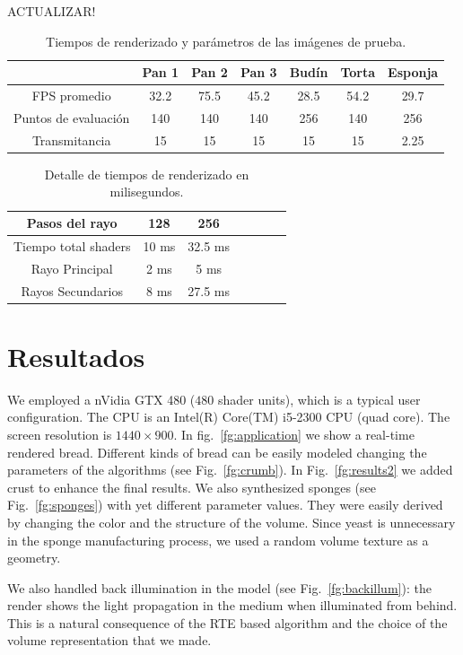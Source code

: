 ACTUALIZAR!
\begin{table}[htb]
\centering
\begin{tabular}{|c|c|c|c|c|c|c|}
\hline &  Pan 1 & Pan 2 & Pan 3 & Budín & Torta & Esponja \\
\hline
\hline
 FPS promedio  & 32.2 &  75.5 &  45.2 & 28.5 &  54.2 & 29.7\\
\hline
 Puntos de evaluación &  140 &  140 &  140 & 256 &  140 & 256 \\
\hline
 Transmitancia &  15 &  15 &  15 & 15 &  15 & 2.25 \\
\hline
\end{tabular}
\caption{Tiempos de renderizado y parámetros de las imágenes de prueba.}
\label{tab:n1}
\end{table}

\begin{table}[htb]
\centering
\begin{tabular}{|c|c|c|c|c|c|c|}
\hline
 Pasos del rayo         & 128 &  256 \\
\hline
\hline
 Tiempo total shaders   & 10 ms &  32.5 ms \\
\hline
 Rayo Principal         & 2 ms  & 5 ms  \\
\hline
 Rayos Secundarios      &  8 ms & 27.5 ms  \\
\hline
\end{tabular}
\caption{Detalle de tiempos de renderizado en milisegundos.}
\label{tab:n2}
\end{table}


\section{Resultados}
We employed a nVidia GTX 480 ($480$ shader units), which is a typical user configuration.
The CPU is an Intel(R) Core(TM) i5-2300 CPU (quad core).
The screen resolution is $1440\times900$.
In fig.~\ref{fg:application} we show a real-time rendered bread.
Different kinds of bread can be easily modeled changing the parameters of the algorithms (see Fig.~\ref{fg:crumb}).
In Fig.~\ref{fg:results2} we added crust to enhance the final results. 
We also synthesized sponges (see Fig.~\ref{fg:sponges}) with yet different parameter values.
They were easily derived by changing the color and the structure of the volume.
Since yeast is unnecessary in the sponge manufacturing process, we used a random volume texture as a geometry.

We also handled back illumination in the model (see Fig.~\ref{fg:backillum}): the render shows the light propagation in the medium when illuminated from behind.
This is a natural consequence of the RTE based algorithm and the choice of the volume representation that we made.


